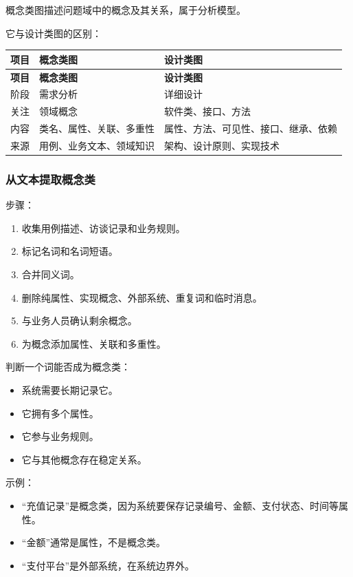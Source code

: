 \documentclass[UTF8,zihao=-4]{ctexart}
\begin{document}
概念类图描述问题域中的概念及其关系，属于分析模型。

它与设计类图的区别：

\begin{longtable}{|>{\raggedright\arraybackslash}p{}|>{\raggedright\arraybackslash}p{}|>{\raggedright\arraybackslash}p{}|}
\hline
\textbf{项目} & \textbf{概念类图} & \textbf{设计类图} \\
\hline
\endfirsthead
\hline
\textbf{项目} & \textbf{概念类图} & \textbf{设计类图} \\
\hline
\endhead
阶段 & 需求分析 & 详细设计 \\
\hline
关注 & 领域概念 & 软件类、接口、方法 \\
\hline
内容 & 类名、属性、关联、多重性 & 属性、方法、可见性、接口、继承、依赖 \\
\hline
来源 & 用例、业务文本、领域知识 & 架构、设计原则、实现技术 \\
\hline
\end{longtable}

\subsubsection{从文本提取概念类}

步骤：

\begin{enumerate}
\item 收集用例描述、访谈记录和业务规则。
\item 标记名词和名词短语。
\item 合并同义词。
\item 删除纯属性、实现概念、外部系统、重复词和临时消息。
\item 与业务人员确认剩余概念。
\item 为概念添加属性、关联和多重性。
\end{enumerate}

判断一个词能否成为概念类：

\begin{itemize}
\item 系统需要长期记录它。
\item 它拥有多个属性。
\item 它参与业务规则。
\item 它与其他概念存在稳定关系。
\end{itemize}

示例：

\begin{itemize}
\item “充值记录”是概念类，因为系统要保存记录编号、金额、支付状态、时间等属性。
\item “金额”通常是属性，不是概念类。
\item “支付平台”是外部系统，在系统边界外。
\end{itemize}
\end{document}
